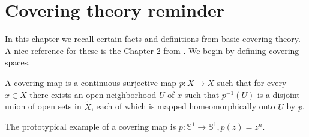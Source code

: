 \documentclass{report}
\begin{document}
\appendix

\chapter{Covering theory reminder}
In this chapter we recall certain facts and definitions from basic covering theory.
A nice reference for these is the Chapter 2 from \cite{hatcher2002topology}.
We begin by defining covering spaces.
\begin{definition}
    A covering map is a continuous surjective map $p: \tilde X \to X$ such that for every $x \in X$ there exists an open neighborhood $U$ of $x$ such that $p^{-1}(U)$ is a disjoint union of open sets in $\tilde X$, each of which is mapped homeomorphically onto $U$ by $p$.
\end{definition}
The prototypical example of a covering map is $p: \mathbb S^1 \to \mathbb S^1, p(z) = z^n$.
\end{document}
